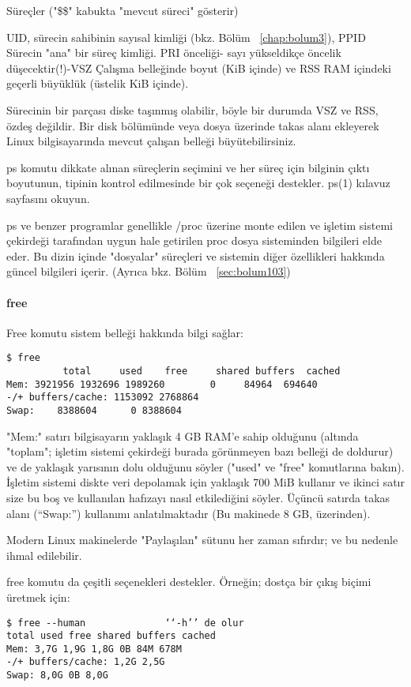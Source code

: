 \begin{section}{Süreçler}
("\$\$" kabukta "mevcut süreci" gösterir)

UID, sürecin sahibinin sayısal kimliği (bkz. Bölüm ~\ref{chap:bolum3}), PPID Sürecin "ana" bir süreç kimliği. PRI önceliği- sayı yükseldikçe öncelik düşecektir(!)-VSZ Çalışma belleğinde boyut (KiB içinde) ve RSS RAM içindeki geçerli büyüklük (üstelik KiB içinde).

Sürecinin bir parçası diske taşınmış olabilir, böyle bir durumda VSZ ve RSS, özdeş değildir. Bir disk bölümünde veya dosya üzerinde takas alanı ekleyerek Linux bilgisayarında mevcut çalışan belleği büyütebilirsiniz. 

ps komutu dikkate alınan süreçlerin seçimini ve her süreç için bilginin çıktı boyutunun, tipinin kontrol edilmesinde bir çok seçeneği destekler. ps(1) kılavuz sayfasını okuyun.

ps ve benzer programlar genellikle /proc üzerine monte edilen ve işletim sistemi çekirdeği tarafından uygun hale getirilen proc dosya sisteminden bilgileri elde eder. Bu dizin içinde "dosyalar" süreçleri ve sistemin diğer özellikleri hakkında güncel bilgileri içerir. (Ayrıca bkz. Bölüm ~\ref{sec:bolum103})
\paragraph{free}{Free komutu sistem belleği hakkında bilgi sağlar:
\begin{verbatim}
$ free
          total     used    free     shared buffers  cached
Mem: 3921956 1932696 1989260        0     84964  694640 
-/+ buffers/cache: 1153092 2768864
Swap:    8388604      0 8388604
\end{verbatim}
}

"Mem:" satırı bilgisayarın yaklaşık 4 GB RAM'e sahip olduğunu (altında "toplam"; işletim sistemi çekirdeği burada görünmeyen bazı belleği de doldurur) ve de yaklaşık yarısının dolu olduğunu söyler ("used" ve "free" komutlarına bakın). İşletim sistemi diskte veri depolamak için yaklaşık 700 MiB kullanır ve ikinci satır size bu boş ve kullanılan hafızayı nasıl etkilediğini söyler. Üçüncü satırda takas alanı (“Swap:”) kullanımı anlatılmaktadır (Bu makinede 8 GB, üzerinden).

Modern Linux makinelerde "Paylaşılan" sütunu her zaman sıfırdır; ve bu nedenle ihmal edilebilir.

free komutu da çeşitli seçenekleri destekler. Örneğin; dostça bir çıkış biçimi üretmek için:
\begin{verbatim}
$ free --human 				‘‘-h’’ de olur
total used free shared buffers cached
Mem: 3,7G 1,9G 1,8G 0B 84M 678M
-/+ buffers/cache: 1,2G 2,5G
Swap: 8,0G 0B 8,0G
\end{verbatim}


\end{section}
